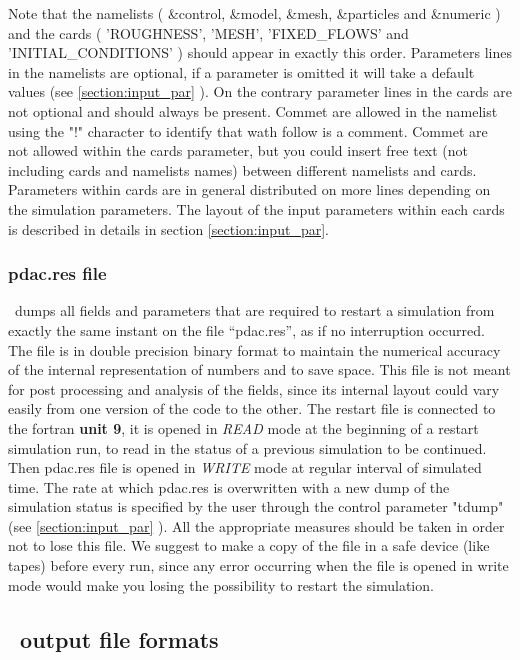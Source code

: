 Note that the namelists ( \&control, \&model, \&mesh, \&particles and \&numeric )
and the cards ( 'ROUGHNESS', 'MESH', 'FIXED\_FLOWS' and 'INITIAL\_CONDITIONS' )
should appear in exactly this order. 
Parameters lines in the namelists are optional, if a parameter is omitted
it will take a default values (see \ref{section:input_par} ).
On the contrary parameter lines in the cards are not optional and
should always be present.
Commet are allowed in the namelist using the "!" character to identify 
that wath follow is a comment. Commet are not allowed within the cards
parameter, but you could insert free text (not including cards and namelists names)
between different namelists and cards.
Parameters within cards are in general distributed on more lines depending
on the simulation parameters. The layout of the input parameters 
within each cards is described in details in section \ref{section:input_par}.

\subsubsection{pdac.res file}
\label{section:pdac_res}

\PDAC\ dumps all fields and parameters that are required to restart a 
simulation from exactly the same instant on the file ``pdac.res'',
as if no interruption occurred. The file is in double precision 
binary format to maintain the numerical accuracy of the internal 
representation of numbers and to save space. 
This file is not meant for post processing
and analysis of the fields, since its internal layout could
vary easily from one version of the code to the other.
The restart file is connected to the fortran {\bf unit 9}, it is
opened in {\it READ} mode at the beginning of a restart simulation run,
to read in the status of a previous simulation to be continued.
Then pdac.res file is opened in {\it WRITE} mode at regular interval
of simulated time. The rate at which pdac.res is overwritten
with a new dump of the simulation status is specified by
the user through the control parameter "tdump" 
(see \ref{section:input_par} ).
All the appropriate measures should be taken in order
not to lose this file. We suggest to make a copy of the file in 
a safe device (like tapes) before every run, since any error occurring
when the file is opened in write mode would make you losing the possibility
to restart the simulation.

\subsection{\PDAC\ output file formats}
\label{section:output_files}

